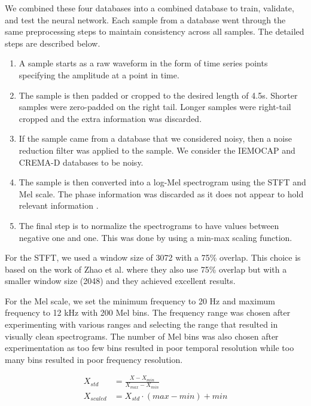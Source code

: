 \documentclass[a4paper, 10pt, conference]{ieeeconf}      %
\begin{document}
We combined these four databases into a combined database to train, validate, and test the neural network. Each sample from a database went through the same preprocessing steps to maintain consistency across all samples. The detailed steps are described below.
\begin{enumerate}
	\item A sample starts as a raw waveform in the form of time series points specifying the amplitude at a point in time.
	\item The sample is then padded or cropped to the desired length of 4.5s. Shorter samples were zero-padded on the right tail. Longer samples were right-tail cropped and the extra information was discarded.
	\item If the sample came from a database that we considered noisy, then a noise reduction filter was applied to the sample. We consider the IEMOCAP and CREMA-D databases to be noisy.
	\item The sample is then converted into a log-Mel spectrogram using the STFT and Mel scale. The phase information was discarded as it does not appear to hold relevant information \cite{Kozakowski2017}.
	\item The final step is to normalize the spectrograms to have values between negative one and one. This was done by using a min-max scaling function.
\end{enumerate}

For the STFT, we used a window size of 3072 with a 75\% overlap. This choice is based on the work of Zhao et al. \cite{Zhao2019} where they also use 75\% overlap but with a smaller window size (2048) and they achieved excellent results. 

For the Mel scale, we set the minimum frequency to 20 Hz and maximum frequency to 12 kHz with 200 Mel bins. The frequency range was chosen after experimenting with various ranges and selecting the range that resulted in visually clean spectrograms. The number of Mel bins was also chosen after experimentation as too few bins resulted in poor temporal resolution while too many bins resulted in poor frequency resolution.

\begin{equation}
	\label{minmaxscale}
	\begin{aligned}
		X_{std} &= \frac{X - X_{min}}{X_{max} - X_{min}}\\
		X_{scaled} &= X_{std} \cdot (max - min) + min
	\end{aligned}
\end{equation}
\end{document}
